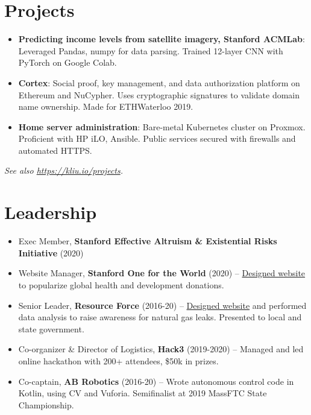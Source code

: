 \documentclass[letterpaper,11pt]{article}
\begin{document}
\section{Projects}

\begin{itemize}[label=--]
     \item \textbf{Predicting income levels from satellite imagery, Stanford ACMLab}:
           Leveraged Pandas, numpy for data parsing. Trained 12-layer CNN with PyTorch on
           Google Colab.

     \item \textbf{Cortex}: Social proof, key management, and data authorization platform
           on Ethereum and NuCypher. Uses cryptographic signatures to validate domain name
           ownership. Made for ETHWaterloo 2019.

     \item \textbf{Home server administration}: Bare-metal Kubernetes cluster on Proxmox.
           Proficient with HP iLO, Ansible. Public services secured with firewalls and
           automated HTTPS.
\end{itemize}

\textit{See also \url{https://kliu.io/projects}.}

\section{Leadership}

\begin{itemize}[label=--]
     \item Exec Member, \textbf{Stanford Effective Altruism \& Existential Risks
                Initiative} (2020)
     \item Website Manager, \textbf{Stanford One for the World} (2020) --
           \href{https://onefortheworld.su.domains}{Designed website} to popularize
           global health and development donations.
     \item Senior Leader, \textbf{Resource Force} (2016-20) --
           \href{https://gasleaks.info}{Designed website} and performed data analysis
           to raise awareness for natural gas leaks. Presented to local and state
           government.
     \item Co-organizer \& Director of Logistics, \textbf{Hack3} (2019-2020) -- Managed and led online hackathon
           with 200+ attendees, \$50k in prizes.
     \item Co-captain, \textbf{AB Robotics} (2016-20) -- Wrote autonomous control code in
           Kotlin, using CV and Vuforia. Semifinalist at 2019 MassFTC State Championship.
\end{itemize}
\end{document}
